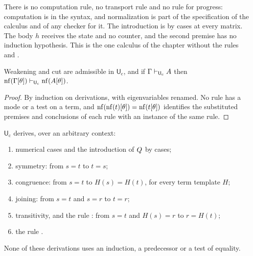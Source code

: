 There is no computation rule, no transport rule and no rule for progress:
computation is in the syntax, and normalization is part of the
specification of the calculus and of any checker for it.  The introduction
 is by cases at every matrix.  The body $h$ receives the state
and no counter, and the second premise has no induction hypothesis.  This
is the one calculus of the chapter without the rules  and
.

\begin{lemma}
\label{kern:lem:ucstruct}
Weakening and cut are admissible in $\mathsf{U}_{\mathrm{c}}$, and if
$\Gamma\vdash_{\mathsf{U}_{\mathrm{c}}}A$ then
$\operatorname{nf}(\Gamma[\theta])\vdash_{\mathsf{U}_{\mathrm{c}}}\operatorname{nf}(A[\theta])$.
\end{lemma}

\begin{proof}
By induction on derivations, with eigenvariables renamed.  No rule has a
mode or a test on a term, and
$\operatorname{nf}(\operatorname{nf}(t)[\theta])=\operatorname{nf}(t[\theta])$ identifies the substituted premises
and conclusions of each rule with an instance of the same rule.
\end{proof}

\begin{lemma}
\label{kern:lem:uxeq}
$\mathsf{U}_{\mathrm{c}}$ derives, over an arbitrary context:
\begin{enumerate}[label=\textup{(\roman*)}]
\item numerical cases and the introduction of $Q_{}$ by cases;
\item symmetry: from $s=t$ to $t=s$;
\item congruence: from $s=t$ to $H(s)=H(t)$, for every term template $H$;
\item joining: from $s=t$ and $s=r$ to $t=r$;
\item transitivity, and the rule : from $s=t$ and $H(s)=r$ to
 $r=H(t)$;
\item the rule .
\end{enumerate}
None of these derivations uses an induction, a predecessor or a test of
equality.
\end{lemma}

